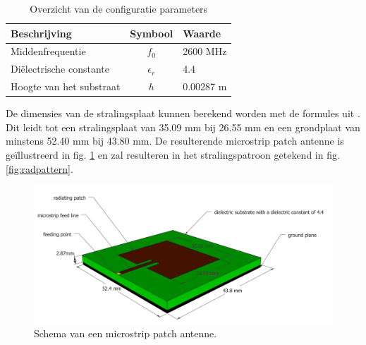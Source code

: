 \documentclass[twocolumn]{phdsymp_dutch}
\begin{document}
\begin{table}[h!]
\centering
\begin{tabular}{|l|c|l|}
\hline
 Beschrijving            & Symbool          & Waarde         \\    \hline
 Middenfrequentie      & $f_0$           & 2600 MHz       \\ 
 Di\"electrische constante    & $\epsilon_r$    & 4.4         \\ 
 Hoogte van het substraat & $h$             & 0.00287 m    \\ \hline
\end{tabular}
\caption{Overzicht van de configuratie parameters}
\label{table:antennaparas}
\end{table}

De dimensies van de stralingsplaat kunnen berekend worden met de formules uit \cite{J14_antennadesign,J15_antennadesign}.
Dit leidt tot een stralingsplaat van 35.09 mm bij 26.55 mm en  een grondplaat van minstens 52.40 mm bij 43.80 mm.
De resulterende microstrip patch antenne is ge\"illustreerd in fig. \ref{fig:basicpatchantenna} en zal resulteren 
in het stralingspatroon getekend in fig. \ref{fig:radpattern}.
\begin{figure}[h!]
\centering
  \includegraphics[width=\linewidth]{MicrostripAntenna.png}
  \caption{Schema van een microstrip patch antenne.}
  \label{fig:basicpatchantenna}
\end{figure}
\end{document}
